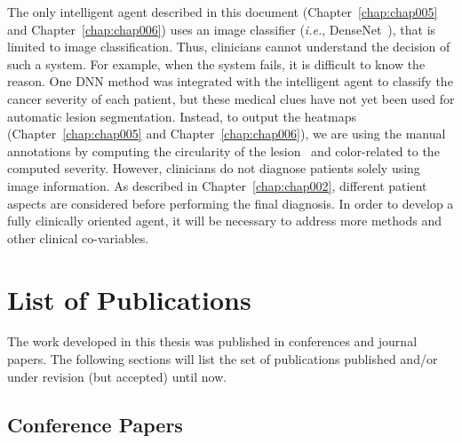 The only intelligent agent described in this document (Chapter~\ref{chap:chap005} and Chapter~\ref{chap:chap006}) uses an image classifier ({\it i.e.}, DenseNet~\cite{Huang_2017_CVPR}), that is limited to image classification.
Thus, clinicians cannot understand the decision of such a system.
For example, when the system fails, it is difficult to know the reason.
One \ac{DNN} method was integrated with the intelligent agent to classify the cancer severity of each patient, but these medical clues have not yet been used for automatic lesion segmentation.
Instead, to output the heatmaps (Chapter~\ref{chap:chap005} and Chapter~\ref{chap:chap006}), we are using the manual annotations by computing the circularity of the lesion~\cite{DALILA2017749} and color-related to the computed severity.
However, clinicians do not diagnose patients solely using image information.
As described in Chapter~\ref{chap:chap002}, different patient aspects are considered before performing the final diagnosis.
In order to develop a fully clinically oriented agent, it will be necessary to address more methods and other clinical co-variables.

\section{List of Publications}
\label{sec:sec001006}

The work developed in this thesis was published in conferences and journal papers. The following sections will list the set of publications published and/or under revision (but accepted) until now.

\subsection{Conference Papers}
\label{sec:sec00100601}

